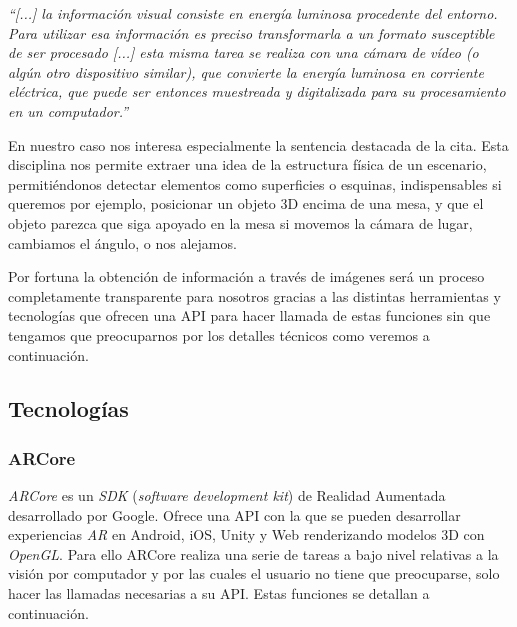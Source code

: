     \textit{``[...] la información visual consiste en energía luminosa procedente del entorno. Para utilizar esa información es preciso transformarla a un formato susceptible de ser procesado [...] esta misma tarea se realiza con una cámara de vídeo (o algún otro dispositivo similar), que convierte la energía luminosa en corriente eléctrica, que puede ser entonces muestreada y digitalizada para su procesamiento en un computador.''}

En nuestro caso nos interesa especialmente la sentencia destacada de la cita. Esta disciplina nos permite extraer una idea de la estructura física de un escenario, permitiéndonos detectar elementos como superficies o esquinas, indispensables si queremos por ejemplo, posicionar un objeto 3D encima de una mesa, y que el objeto parezca que siga apoyado en la mesa si movemos la cámara de lugar, cambiamos el ángulo, o nos alejamos.

Por fortuna la obtención de información a través de imágenes será un proceso completamente transparente para nosotros gracias a las distintas herramientas y tecnologías que ofrecen una API para hacer llamada de estas funciones sin que tengamos que preocuparnos por los detalles técnicos como veremos a continuación.

\subsection{Tecnologías}
\subsubsection*{ARCore}

\textit{ARCore}\cite{arcore}  es un \textit{SDK} (\textit{software development kit}) de Realidad Aumentada desarrollado por Google. Ofrece una API con la que se pueden desarrollar experiencias \textit{AR} en Android, iOS, Unity y Web renderizando modelos 3D con \textit{OpenGL}. Para ello ARCore realiza una serie de tareas a bajo nivel relativas a la visión por computador y por las cuales el usuario no tiene que preocuparse, solo hacer las llamadas necesarias a su API. Estas funciones se detallan a continuación.

